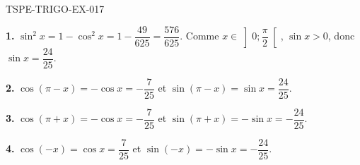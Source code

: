 \begin{corrige}{TSPE-TRIGO-EX-017}

\textbf{1.} $\sin^2 x = 1 - \cos^2 x = 1 - \dfrac{49}{625} = \dfrac{576}{625}$. Comme $x \in \left]0;\dfrac{\pi}{2}\right[$, $\sin x > 0$, donc $\sin x = \dfrac{24}{25}$.

\textbf{2.} $\cos(\pi - x) = -\cos x = -\dfrac{7}{25}$ et $\sin(\pi - x) = \sin x = \dfrac{24}{25}$.

\textbf{3.} $\cos(\pi + x) = -\cos x = -\dfrac{7}{25}$ et $\sin(\pi + x) = -\sin x = -\dfrac{24}{25}$.

\textbf{4.} $\cos(-x) = \cos x = \dfrac{7}{25}$ et $\sin(-x) = -\sin x = -\dfrac{24}{25}$.

\end{corrige}
